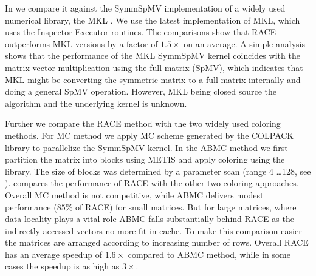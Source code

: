 In  we compare it against the \acrshort{SymmSpMV} 
implementation of a widely used numerical library, the \acrshort{MKL} \cite{MKL}. 
We use the latest implementation of MKL, which uses the Inspector-Executor routines.
The comparisons show that \acrshort{RACE} outperforms MKL
versions by a factor of $1.5\times$ on an average. 
A simple analysis
shows that the performance of the \acrshort{MKL} \acrshort{SymmSpMV} 
kernel coincides with the matrix vector multiplication using the full
matrix (\acrshort{SpMV}), which indicates that MKL might be converting
the symmetric matrix to a full matrix internally and doing a general \acrshort{SpMV}
operation. However, MKL being closed source  the algorithm and the underlying 
kernel is unknown.

Further we compare the \acrshort{RACE} method with the two widely used
coloring methods. For \acrshort{MC} method we apply \acrlong{MC} scheme
generated by the COLPACK \cite{COLPACK} library to parallelize the \acrshort{SymmSpMV}
kernel. In the \acrshort{ABMC} method we first partition the matrix into blocks
using METIS \cite{METIS} and apply coloring using the \COLPACK library. The
size of blocks was determined by a parameter scan (range 4 \ldots 128, see \cite{ABMC}).
 compares the performance of \acrshort{RACE} with the other 
two coloring approaches.
Overall \acrshort{MC} method is not competitive, while \acrshort{ABMC} delivers
modest performance ($85 \%$ of \acrshort{RACE}) for small matrices. But for large
matrices,  where data locality plays a vital role \acrshort{ABMC} 
falls substantially behind \acrshort{RACE} as the indirectly
accessed vectors no more fit in cache. To make this comparison easier
the matrices are arranged according to increasing number of rows.
Overall \acrshort{RACE} has an average speedup of $1.6\times$ compared to 
\acrshort{ABMC} method, while in some cases the speedup is as high as $3\times$.






